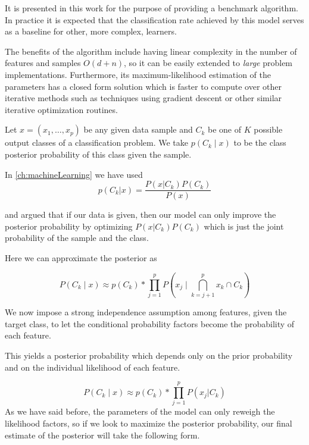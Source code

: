 It is presented in this work for the purpose of providing a benchmark algorithm.
In practice it is expected that the classification rate achieved by this model serves as a baseline for other, more complex, learners.

The benefits of the algorithm include having linear complexity in the number of features and samples $O(d+n)$, so it can be easily extended to \textit{large} problem implementations.
Furthermore, its maximum-likelihood estimation of the parameters has a closed form solution which is faster to compute over other iterative methods such as techniques using gradient descent or other similar iterative optimization routines.

Let $x = (x_1,\ldots,x_p)$ be any given data sample and $C_k$ be one of $K$ possible output classes of a classification problem.
We take $p(C_k \mid x)$ to be the class posterior probability of this class given the sample.

In \cref{ch:machineLearning}
we have used
\begin{equation}
\label{eq:posteriorProbabilties}
p(C_k| x) = \frac{P(x|C_k)P(C_k)}{P(x)}
\end{equation}


and argued that if our data is given, then our model can only improve the posterior probability by optimizing $P(x|C_k)P(C_k)$ which is just the joint probability of the sample and the class.

Here we can approximate the posterior as

\begin{equation}
\label{eq:posteriorProbabilityDecomposition1}
P(C_k \mid x) \approx p(C_k) * \prod_{j=1}^{p}  P(x_j \mid \bigcap_{k=j+1}^{p} x_k \cap C_k)
\end{equation}


We now impose a strong independence assumption among features, given the target class, to let the conditional probability factors become the probability of each feature. %

This yields a posterior probability which depends only on the prior probability and on the individual likelihood of each feature.

\begin{equation}\label{eq:posteriorProbabilityDecomposition2}
P(C_k \mid x) \approx p(C_k) * \prod_{j=1}^{p}  P(x_j | C_k)
\end{equation}
As we have said before, the parameters of the model can only reweigh the likelihood factors, so if we look to maximize the posterior probability, our final estimate of the posterior will take the following form.

